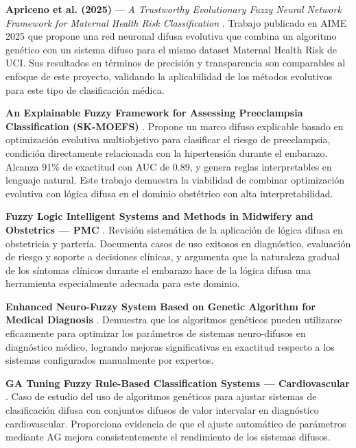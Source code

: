 \documentclass[11pt]{article}
\begin{document}
\textbf{Apriceno et al. (2025)} --- \textit{A Trustworthy Evolutionary Fuzzy Neural Network Framework for Maternal Health Risk Classification} \cite{apriceno2025}. Trabajo publicado en AIME 2025 que propone una red neuronal difusa evolutiva que combina un algoritmo gen\'etico con un sistema difuso para el mismo dataset Maternal Health Risk de UCI. Sus resultados en t\'erminos de precisi\'on y transparencia son comparables al enfoque de este proyecto, validando la aplicabilidad de los m\'etodos evolutivos para este tipo de clasificaci\'on m\'edica.

\textbf{An Explainable Fuzzy Framework for Assessing Preeclampsia Classification (SK-MOEFS)} \cite{skmoe2025}. Propone un marco difuso explicable basado en optimizaci\'on evolutiva multiobjetivo para clasificar el riesgo de preeclampsia, condici\'on directamente relacionada con la hipertensi\'on durante el embarazo. Alcanza 91\% de exactitud con AUC de 0.89, y genera reglas interpretables en lenguaje natural. Este trabajo demuestra la viabilidad de combinar optimizaci\'on evolutiva con l\'ogica difusa en el dominio obst\'etrico con alta interpretabilidad.

\textbf{Fuzzy Logic Intelligent Systems and Methods in Midwifery and Obstetrics --- PMC} \cite{fuzzyobs2021}. Revisi\'on sistem\'atica de la aplicaci\'on de l\'ogica difusa en obstetricia y partería. Documenta casos de uso exitosos en diagn\'ostico, evaluaci\'on de riesgo y soporte a decisiones cl\'inicas, y argumenta que la naturaleza gradual de los s\'intomas cl\'inicos durante el embarazo hace de la l\'ogica difusa una herramienta especialmente adecuada para este dominio.

\textbf{Enhanced Neuro-Fuzzy System Based on Genetic Algorithm for Medical Diagnosis} \cite{neurofuzzyga}. Demuestra que los algoritmos gen\'eticos pueden utilizarse eficazmente para optimizar los par\'ametros de sistemas neuro-difusos en diagn\'ostico m\'edico, logrando mejoras significativas en exactitud respecto a los sistemas configurados manualmente por expertos.

\textbf{GA Tuning Fuzzy Rule-Based Classification Systems --- Cardiovascular} \cite{gatunefuzzy}. Caso de estudio del uso de algoritmos gen\'eticos para ajustar sistemas de clasificaci\'on difusa con conjuntos difusos de valor intervalar en diagn\'ostico cardiovascular. Proporciona evidencia de que el ajuste autom\'atico de par\'ametros mediante AG mejora consistentemente el rendimiento de los sistemas difusos.
\end{document}
